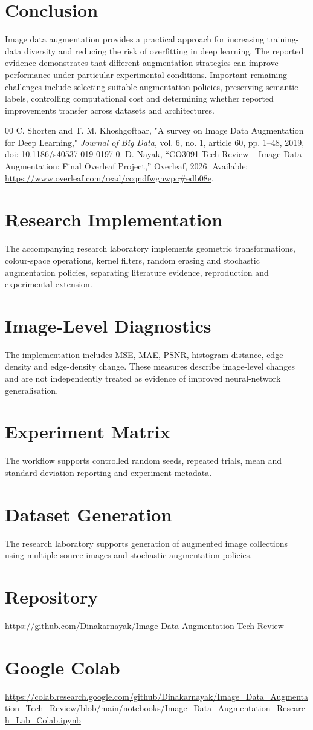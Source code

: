 \documentclass[conference]{IEEEtran}
\begin{document}
\section{Conclusion}
Image data augmentation provides a practical approach for increasing training-data diversity and reducing the risk of overfitting in deep learning. The reported evidence demonstrates that different augmentation strategies can improve performance under particular experimental conditions. Important remaining challenges include selecting suitable augmentation policies, preserving semantic labels, controlling computational cost and determining whether reported improvements transfer across datasets and architectures.
\begin{thebibliography}{00}
C. Shorten and T. M. Khoshgoftaar, "A survey on Image Data Augmentation for Deep Learning," \textit{Journal of Big Data}, vol. 6, no. 1, article 60, pp. 1--48, 2019, doi: 10.1186/s40537-019-0197-0.
D. Nayak, ``CO3091 Tech Review -- Image Data Augmentation: Final Overleaf Project,'' Overleaf, 2026. Available: \url{https://www.overleaf.com/read/ccqndfwgnwpc#edb08e}.
\end{thebibliography}
\appendix
\section{Research Implementation}
The accompanying research laboratory implements geometric transformations, colour-space operations, kernel filters, random erasing and stochastic augmentation policies, separating literature evidence, reproduction and experimental extension.
\section{Image-Level Diagnostics}
The implementation includes MSE, MAE, PSNR, histogram distance, edge density and edge-density change. These measures describe image-level changes and are not independently treated as evidence of improved neural-network generalisation.
\section{Experiment Matrix}
The workflow supports controlled random seeds, repeated trials, mean and standard deviation reporting and experiment metadata.
\section{Dataset Generation}
The research laboratory supports generation of augmented image collections using multiple source images and stochastic augmentation policies.
\section{Repository}
\url{https://github.com/Dinakarnayak/Image-Data-Augmentation-Tech-Review}
\section{Google Colab}
\url{https://colab.research.google.com/github/Dinakarnayak/Image_Data_Augmentation_Tech_Review/blob/main/notebooks/Image_Data_Augmentation_Research_Lab_Colab.ipynb}
\end{document}
